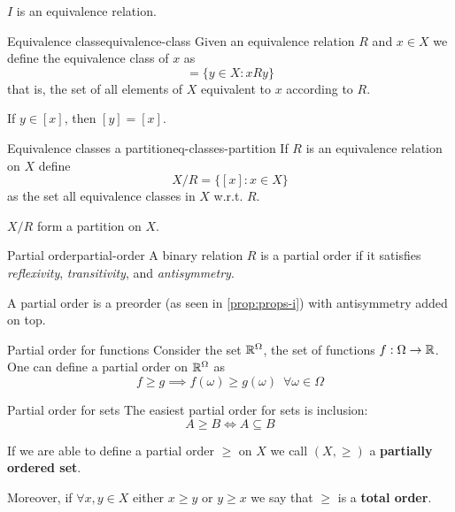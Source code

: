 \documentclass[12pt]{extarticle}
\begin{document}
\begin{corollary}{}{}
    $I$ is an equivalence relation.
\end{corollary}

\begin{definition}{Equivalence class}{equivalence-class}
    Given an equivalence relation $R$ and $x \in X$ we define the equivalence class of $x$ as
    \begin{equation}
        [x] = \{y \in X : xRy\}
    \end{equation}
    that is, the set of all elements of $X$ equivalent to $x$ according to $R$.
\end{definition}

\begin{lemma}{}{}
    If $y \in [x]$, then $[y] = [x]$.
\end{lemma}

\begin{proposition}{Equivalence classes a partition}{eq-classes-partition}
    If $R$ is an equivalence relation on $X$ define
    \begin{equation}
        X/R = \{ [x] : x\in X \}
    \end{equation}
    as the set all equivalence classes in $X$ w.r.t. $R$.

    $X/R$ form a partition on $X$.
\end{proposition}

\begin{definition}{Partial order}{partial-order}
    A binary relation $R$ is a partial order if it satisfies \textit{reflexivity}, \textit{transitivity}, and \textit{antisymmetry}.
\end{definition}

A partial order is a preorder (as seen in \cref{prop:props-i}) with antisymmetry added on top.

\begin{example}{Partial order for functions}{}
    Consider the set $\mathbb{R}^\Omega$, the set of functions $f: \Omega \to \mathbb{R}$.
    One can define a partial order on $\mathbb{R}^\Omega$ as
    \begin{equation}
        f \geq g \implies f(\omega) \geq g(\omega) \enspace \forall \omega \in \Omega
    \end{equation}

\end{example}

\begin{example}{Partial order for sets}{}
    The easiest partial order for sets is inclusion:
    \begin{equation}
        A \geq B \iff A \subseteq B
    \end{equation}
\end{example}

If we are able to define a partial order $\geq$ on $X$ we call $(X, \geq)$ a \textbf{partially ordered set}.

Moreover, if $\forall x, y \in X$ either $x \geq y$ or $y \geq x$ we say that $\geq$ is a \textbf{total order}.
\end{document}
